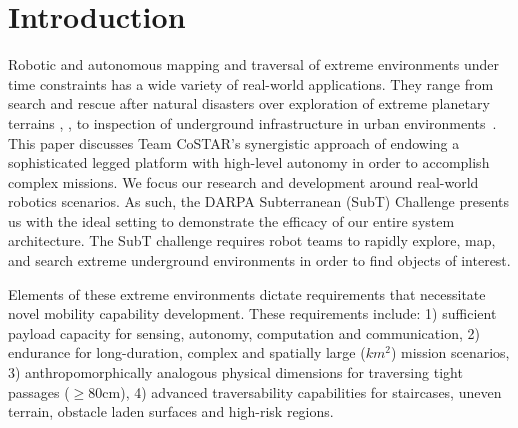 \documentclass[letterpaper, 10pt, conference]{ieeeconf}      %
\newcommand{\rev}[1]{{\color{blue} #1 }} %
\begin{document}



\section{Introduction}\label{sec:intro}
\rev{Robotic and autonomous mapping and traversal of extreme environments under time constraints has a wide variety of real-world applications. 
They range from search and rescue after natural disasters \cite{Nagatani2013} over exploration of extreme planetary terrains \rev{\cite{ali-agu}, \cite{Taka2020JFR}, \cite{Husain2013}}to inspection of underground infrastructure in urban environments~\cite{Kolvenbach2020}.
This paper discusses Team CoSTAR's synergistic approach of endowing a sophisticated legged platform with high-level autonomy in order to accomplish complex missions. We focus our research and development around real-world robotics scenarios. 
As such, the DARPA Subterranean (SubT) Challenge \cite{subt_webpage} presents us with the ideal setting to demonstrate the efficacy of our entire system architecture. 
The SubT challenge requires robot teams to rapidly explore, map, and search extreme underground environments in order to find objects of interest.

Elements of these extreme environments dictate requirements that necessitate novel mobility capability development. These requirements include:
1) sufficient payload capacity for sensing, autonomy, computation and communication, 2) endurance for long-duration, complex and spatially large (\texttildelow $km^2$) mission scenarios, 3) anthropomorphically analogous physical dimensions for traversing tight passages ($\geq$80cm), 4) advanced traversability capabilities for staircases, uneven terrain, obstacle laden surfaces and high-risk regions.}
\end{document}
